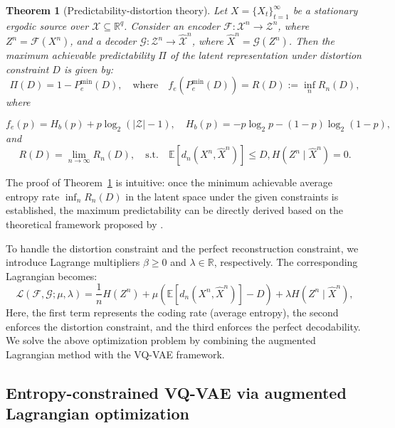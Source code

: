 \documentclass[12pt,review,authoryear]{elsarticle}
\theoremstyle{upright}
\newtheorem{theorem}{Theorem}
\begin{document}
\begin{theorem}[Predictability-distortion theory]\label{thm:PD}
Let \(X = \{X_t\}_{t=1}^{\infty}\) be a stationary ergodic source over \(\mathcal{X} \subseteq \mathbb{R}^q\).  
Consider an encoder \(\mathcal{F}: \mathcal{X}^n \rightarrow \mathcal{Z}^n\), where \(Z^n = \mathcal{F}(X^n)\),  
and a decoder \(\mathcal{G}: \mathcal{Z}^n \rightarrow \hat{\mathcal{X}}^n\), where \(\hat{X}^n = \mathcal{G}(Z^n)\). Then the maximum achievable predictability $\Pi$ of the latent representation under distortion constraint \(D\) is given by:
\[
\Pi(D) = 1 - P_e^{\min}(D), \quad \text{where} \quad f_e\left(P_e^{\min }(D)\right)=R(D):=\inf _{n} R_n(D),
\]
where

\[
f_e(p) = H_b(p) + p \log_2(|\mathcal{Z}| - 1), \quad H_b(p) = -p \log_2 p - (1 - p) \log_2 (1 - p),
\]
and
\[
R(D) = \lim_{n \to \infty} R_n(D), \quad \text{s.t.} \quad \mathbb{E}\left[d_n\left(X^n, \hat{X}^n\right)\right] \leq D, H\left(Z^n \mid \hat{X}^n\right)=0.
\]

\end{theorem}

The proof of Theorem~\ref{thm:PD} is intuitive: once the minimum achievable average entropy rate $\inf_n R_n(D)$ in the latent space under the given constraints is established, the maximum predictability can be directly derived based on the theoretical framework proposed by \citet{song2010limits}.

To handle the distortion constraint and the perfect reconstruction constraint, we introduce Lagrange multipliers \(\beta \geq 0\) and \(\lambda \in \mathbb{R}\), respectively. The corresponding Lagrangian becomes:
\begin{equation}
\label{lagrangian}
    \mathcal{L}(\mathcal{F}, \mathcal{G}; \mu, \lambda) = \frac{1}{n} H(Z^n) + \mu\left( \mathbb{E}[d_n(X^n, \hat{X}^n)] - D \right) + \lambda H(Z^n \mid \hat{X}^n),
\end{equation}
Here, the first term represents the coding rate (average entropy), the second enforces the distortion constraint, and the third enforces the perfect decodability. 
We solve the above optimization problem by combining the augmented Lagrangian method with the VQ-VAE framework.
\subsection{Entropy-constrained VQ-VAE via augmented Lagrangian optimization}
\end{document}

